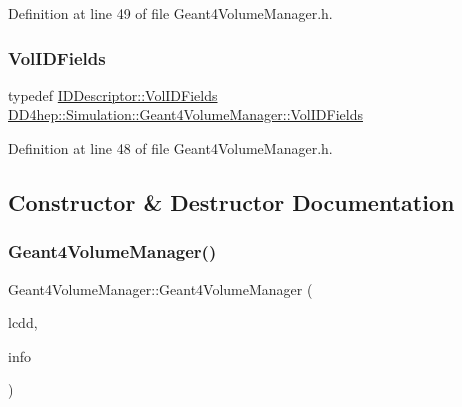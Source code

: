 Definition at line 49 of file Geant4\+Volume\+Manager.\+h.

\hypertarget{class_d_d4hep_1_1_simulation_1_1_geant4_volume_manager_ae80cafd25a138d7c91c24cda4bc350b1}{}\label{class_d_d4hep_1_1_simulation_1_1_geant4_volume_manager_ae80cafd25a138d7c91c24cda4bc350b1} 
\subsubsection{\texorpdfstring{Vol\+I\+D\+Fields}{VolIDFields}}
{\footnotesize\ttfamily typedef \hyperlink{class_d_d4hep_1_1_geometry_1_1_i_d_descriptor_a6c4700a96f3a202eedaa25e54d5695ff}{I\+D\+Descriptor\+::\+Vol\+I\+D\+Fields} \hyperlink{class_d_d4hep_1_1_simulation_1_1_geant4_volume_manager_ae80cafd25a138d7c91c24cda4bc350b1}{D\+D4hep\+::\+Simulation\+::\+Geant4\+Volume\+Manager\+::\+Vol\+I\+D\+Fields}}



Definition at line 48 of file Geant4\+Volume\+Manager.\+h.



\subsection{Constructor \& Destructor Documentation}
\hypertarget{class_d_d4hep_1_1_simulation_1_1_geant4_volume_manager_a4e434e1e81dec955ac925c4bb26cb420}{}\label{class_d_d4hep_1_1_simulation_1_1_geant4_volume_manager_a4e434e1e81dec955ac925c4bb26cb420} 
\subsubsection{\texorpdfstring{Geant4\+Volume\+Manager()}{Geant4VolumeManager()}\hspace{0.1cm}{\footnotesize\ttfamily [1/5]}}
{\footnotesize\ttfamily Geant4\+Volume\+Manager\+::\+Geant4\+Volume\+Manager (\begin{DoxyParamCaption}\item[{\hyperlink{class_d_d4hep_1_1_geometry_1_1_l_c_d_d}{Geometry\+::\+L\+C\+DD} \&}]{lcdd,  }\item[{\hyperlink{class_d_d4hep_1_1_simulation_1_1_geant4_geometry_info}{Geant4\+Geometry\+Info} $\ast$}]{info }\end{DoxyParamCaption})}



